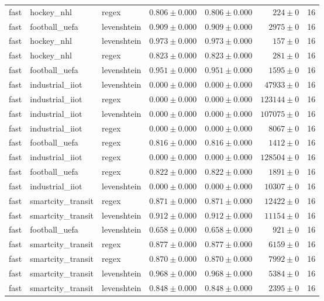 \begin{table}[htbp]
\begin{tabular}{l l l r r r r}
fast & hockey\_nhl & regex & $0.806\pm0.000$ & $0.806\pm0.000$ & $224\pm0$ & 16 \\
fast & football\_uefa & levenshtein & $0.909\pm0.000$ & $0.909\pm0.000$ & $2975\pm0$ & 16 \\
fast & hockey\_nhl & levenshtein & $0.973\pm0.000$ & $0.973\pm0.000$ & $157\pm0$ & 16 \\
fast & hockey\_nhl & regex & $0.823\pm0.000$ & $0.823\pm0.000$ & $281\pm0$ & 16 \\
fast & football\_uefa & levenshtein & $0.951\pm0.000$ & $0.951\pm0.000$ & $1595\pm0$ & 16 \\
fast & industrial\_iiot & levenshtein & $0.000\pm0.000$ & $0.000\pm0.000$ & $47933\pm0$ & 16 \\
fast & industrial\_iiot & regex & $0.000\pm0.000$ & $0.000\pm0.000$ & $123144\pm0$ & 16 \\
fast & industrial\_iiot & levenshtein & $0.000\pm0.000$ & $0.000\pm0.000$ & $107075\pm0$ & 16 \\
fast & industrial\_iiot & regex & $0.000\pm0.000$ & $0.000\pm0.000$ & $8067\pm0$ & 16 \\
fast & football\_uefa & regex & $0.816\pm0.000$ & $0.816\pm0.000$ & $1412\pm0$ & 16 \\
fast & industrial\_iiot & regex & $0.000\pm0.000$ & $0.000\pm0.000$ & $128504\pm0$ & 16 \\
fast & football\_uefa & regex & $0.822\pm0.000$ & $0.822\pm0.000$ & $1891\pm0$ & 16 \\
fast & industrial\_iiot & levenshtein & $0.000\pm0.000$ & $0.000\pm0.000$ & $10307\pm0$ & 16 \\
fast & smartcity\_transit & regex & $0.871\pm0.000$ & $0.871\pm0.000$ & $12422\pm0$ & 16 \\
fast & smartcity\_transit & levenshtein & $0.912\pm0.000$ & $0.912\pm0.000$ & $11154\pm0$ & 16 \\
fast & football\_uefa & levenshtein & $0.658\pm0.000$ & $0.658\pm0.000$ & $921\pm0$ & 16 \\
fast & smartcity\_transit & regex & $0.877\pm0.000$ & $0.877\pm0.000$ & $6159\pm0$ & 16 \\
fast & smartcity\_transit & regex & $0.870\pm0.000$ & $0.870\pm0.000$ & $7992\pm0$ & 16 \\
fast & smartcity\_transit & levenshtein & $0.968\pm0.000$ & $0.968\pm0.000$ & $5384\pm0$ & 16 \\
fast & smartcity\_transit & levenshtein & $0.848\pm0.000$ & $0.848\pm0.000$ & $2395\pm0$ & 16 \\

\end{tabular}
\end{table}
